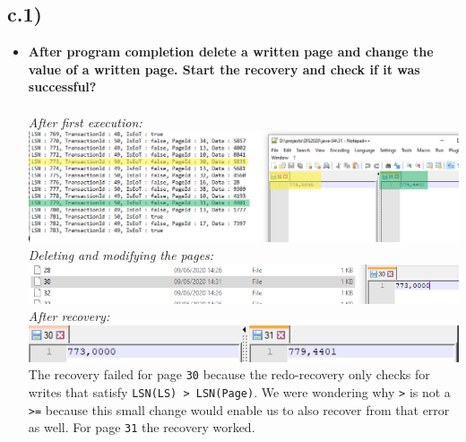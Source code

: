 \documentclass[a4paper,english,abstract=on]{scrartcl}
\begin{document}
\newpage
\subsection*{c.1)}
\begin{itemize}
	\item \textbf{After program completion delete a written page and change the value of a written page. Start the recovery and check if it was successful?}
	\\~\\
	\textit{After first execution:}\\
	\includegraphics[width=\textwidth,height=\textheight,keepaspectratio]{c1_1.png}\\
	
	\textit{Deleting and modifying the pages:}\\
	\includegraphics[width=\textwidth,height=\textheight,keepaspectratio]{c1_2.png}\\
	
	\textit{After recovery:}\\
	\includegraphics[width=\textwidth,height=\textheight,keepaspectratio]{c1_3.png}\\
	
	The recovery failed for page \texttt{30} because the redo-recovery only checks for writes that satisfy \texttt{LSN(LS) > LSN(Page)}. We were wondering why \texttt{>} is not a \texttt{>=} because this small change would enable us to also recover from that error as well. For page \texttt{31} the recovery worked.
\end{itemize}
\end{document}
